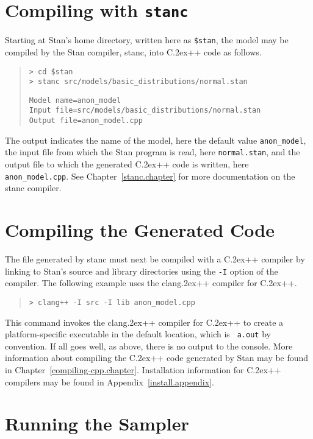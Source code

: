 \documentclass[10pt]{report}
\newcommand{\Stan}{Stan\xspace}
\newcommand{\stanc}{{\ttfamily stanc}\xspace}
\newcommand*{\Cpp}{C\raise.2ex\hbox{\footnotesize ++}\xspace} %
\newcommand{\clang}{{\ttfamily clang\raise.2ex\hbox{\footnotesize ++}}\xspace}
\newcommand{\code}[1]{{\tt #1}}
\newcommand{\refappendix}[1]{Appendix~\ref{#1.appendix}}
\newcommand{\refchapter}[1]{Chapter~\ref{#1.chapter}}
\begin{document}
\section{Compiling  with {\tt\bfseries stanc}}

Starting at \Stan's home directory, written here as {\tt \$stan},
the model may be compiled by the \Stan compiler, \stanc, into \Cpp code
as follows.
%
\begin{quote}
\begin{Verbatim}[fontshape=sl]
> cd $stan
> stanc src/models/basic_distributions/normal.stan
\end{Verbatim}
%
\begin{Verbatim}
Model name=anon_model
Input file=src/models/basic_distributions/normal.stan
Output file=anon_model.cpp
\end{Verbatim}
\end{quote}
%
The output indicates the name of the model, here the default value
\code{anon\_model}, the input file from which the \Stan program is
read, here \code{normal.stan}, and the output file to which the
generated \Cpp code is written, here \code{anon\_model.cpp}.  See
\refchapter{stanc} for more documentation on the \stanc compiler.

\section{Compiling the Generated Code}

The file generated by \stanc must next be compiled with a \Cpp
compiler by linking to \Stan's source and library directories using
the {\tt -I} option of the compiler.  The following example 
uses the \clang compiler for \Cpp.
%
\begin{quote}
\begin{Verbatim}[fontshape=sl]
> clang++ -I src -I lib anon_model.cpp 
\end{Verbatim}
\end{quote}
%
This command invokes the \clang compiler for \Cpp to create a
platform-specific executable in the default location, which is {\tt
  a.out} by convention.  If all goes well, as above, there is no
output to the console.  More information about compiling the \Cpp code
generated by \Stan may be found in \refchapter{compiling-cpp}.
Installation information for \Cpp compilers may be found in
\refappendix{install}.

\section{Running the Sampler}
\end{document}
